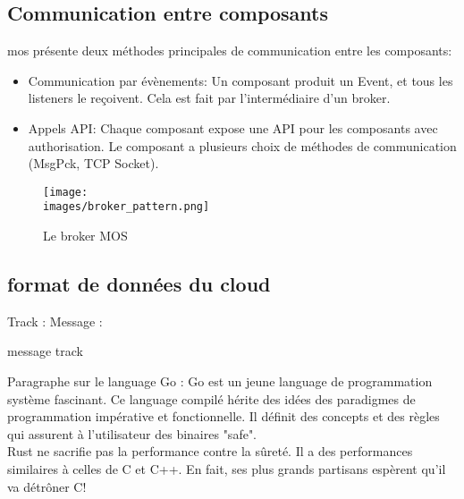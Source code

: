        

    \subsection{Communication entre composants}
       mos  présente deux méthodes principales de communication entre les
        composants:
        \begin{itemize}
            \renewcommand{\labelitemi}{$\bullet$}
            \item Communication par évènements: Un composant produit un Event,
                et tous les listeners le re\c coivent. Cela est fait par l'intermédiaire
                d'un broker.
            \item Appels API: Chaque composant expose une API pour les composants
                avec authorisation. Le composant a plusieurs choix de méthodes de
                communication (MsgPck, TCP Socket).
        \end{itemize}

        \vspace{0.2cm}

        \begin{figure}[ht]
            \centering
            \texttt{[image: \\images/broker\_pattern.png]}
            \caption{Le broker MOS}
        \end{figure}

        \subsection{format de données du cloud }

        Track : 
        Message : 
        

        message track 

        Paragraphe sur le language Go : 
        Go\cite{rust_site} est un jeune language de programmation système
        fascinant. Ce language compilé hérite des idées des paradigmes de
        programmation impérative et fonctionnelle. Il définit des concepts et
        des règles qui assurent à l'utilisateur des binaires "safe".\\[0.3cm]
        Rust ne sacrifie pas la performance contre la sûreté. Il a des
        performances similaires à celles de C et C++. En fait, ses plus grands
        partisans espèrent qu'il va détrôner C!
      
